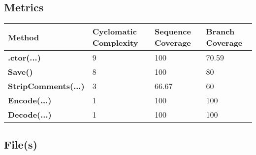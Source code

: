 \documentclass[a4paper,10pt]{article}
\begin{document}
\subsection{Metrics}
\begin{longtable}[l]{|l|l|l|l|}
\hline
\textbf{Method} & \textbf{Cyclomatic Complexity} & \textbf{Sequence Coverage} & \textbf{Branch Coverage}\\
\hline
\textbf{.ctor(...)} & 9 & 100 & 70.59\\
\hline
\textbf{Save()} & 8 & 100 & 80\\
\hline
\textbf{StripComments(...)} & 3 & 66.67 & 60\\
\hline
\textbf{Encode(...)} & 1 & 100 & 100\\
\hline
\textbf{Decode(...)} & 1 & 100 & 100\\
\hline
\end{longtable}
\subsection{File(s)}
\end{document}
